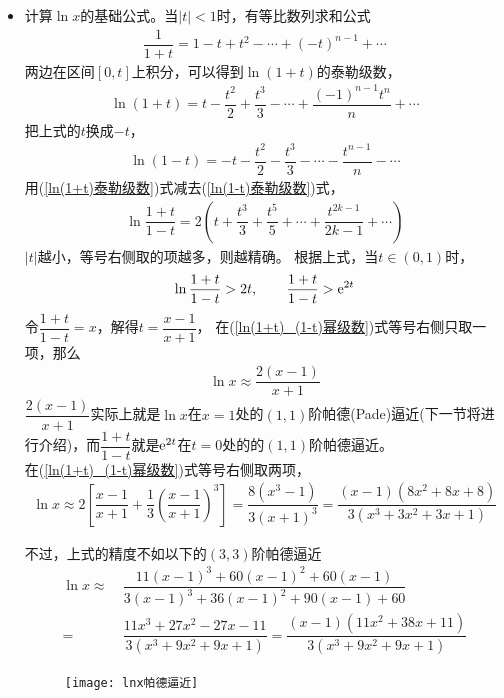 \begin{itemize}[leftmargin=\inteval{\myitemleftmargin}pt,itemsep=
   \inteval{\myitemitempsep}pt,topsep=\inteval{\myitemtopsep}pt]
\item 计算$ \ln x $的基础公式。当$ |t|<1 $时，有等比数列求和公式
\begin{gather*}
    \dfrac{1}{1+t}=1-t+t^2-\cdots+(-t)^{n-1}+\cdots
\end{gather*}
两边在区间$ [0,t] $上积分，可以得到$ \ln(1+t) $的泰勒级数，
\begin{align}\label{ln(1+t)泰勒级数}
    \ln(1+t)=t-\dfrac{t^2}{2}+\dfrac{t^3}{3}-
    \cdots +\dfrac{(-1)^{n-1}t^{n}}{n}+\cdots 
\end{align}
把上式的$ t $换成$ -t $，
\begin{gather}\label{ln(1-t)泰勒级数}
    \ln(1-t)=-t-\dfrac{t^2}{2}-\dfrac{t^3}{3}-
    \cdots -\dfrac{t^{n-1}}{n}-\cdots 
\end{gather}
用(\ref{ln(1+t)泰勒级数})式减去(\ref{ln(1-t)泰勒级数})式，
\begin{align}\label{ln(1+t)_(1-t)幂级数}
    \ln\dfrac{1+t}{1-t}=2\left(t+\dfrac{t^3}{3}+\dfrac{t^5}{5}+\cdots +\dfrac{t^{2k-1}}{2k-1} +\cdots \right)
\end{align}
$ |t| $越小，等号右侧取的项越多，则越精确。
根据上式，当$ t\in(0,1) $时，
\begin{gather}\label{exp(2x)帕德逼近}
    \ln\dfrac{1+t}{1-t}>2t, \quad \quad \dfrac{1+t}{1-t}>\mathrm{e}^{2t} 
\end{gather}
令$ \dfrac{1+t}{1-t}=x $，解得$ t=\dfrac{x-1}{x+1} $，
在(\ref{ln(1+t)_(1-t)幂级数})式等号右侧只取一项，那么
\begin{align} \label{lnt帕德逼近}
    \ln x\approx \dfrac{2(x-1)}{x+1} 
\end{align}
$ \dfrac{2(x-1)}{x+1} $实际上就是$ \ln x $在$ x=1 $处的$ (1,1) $阶帕德(Pade)逼近(下一节将进行介绍)，而$ \dfrac{1+t}{1-t} $就是$ \mathrm{e}^{2t} $在$ t=0 $处的的$ (1,1) $阶帕德逼近。\\
在(\ref{ln(1+t)_(1-t)幂级数})式等号右侧取两项，
\begin{align}\label{lnt近似-泰勒取两项}
    \ln x\approx 2\left[\dfrac{x-1}{x+1}+\dfrac{1}{3}\left(
    \dfrac{x-1}{x+1}\right)^3\right]=\dfrac{8(x^3-1)}{3(x+1)^3}=
    \dfrac{(x-1)(8x^2+8x+8)}{3(x^3+3x^2+3x+1)}
\end{align}

不过，上式的精度不如以下的$ (3,3) $阶帕德逼近
\begin{align}\label{lnt帕德近似3_3}
    \ln x \approx&\ \dfrac{11(x-1)^3+60(x-1)^2+60(x-1)}
    {3(x-1)^3+36(x-1)^2 +90(x-1)+60} \nonumber \\ 
    =&\ \dfrac{11x^3+27x^2-27x-11}{3(x^3+9x^2+9x+1)}=
    \dfrac{(x-1)(11x^2+38x+11)}{3(x^3+9x^2+9x+1)}
\end{align}
\begin{figure}[!htbp]
    \centering
    \texttt{[image: lnx帕德逼近]}
\end{figure}


\end{itemize}
